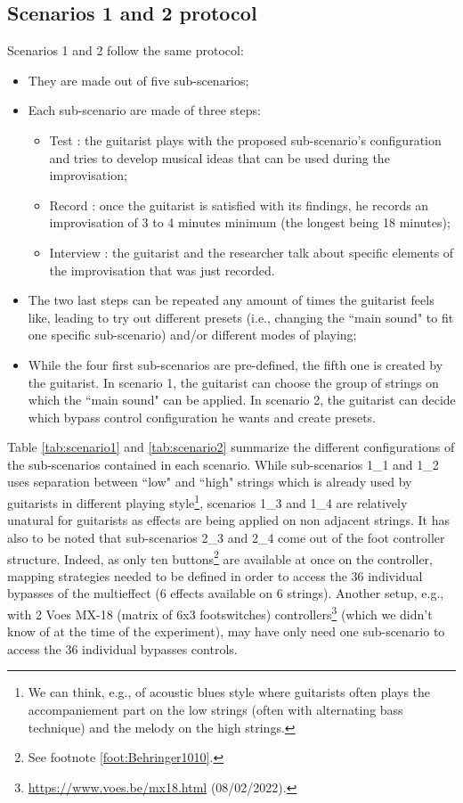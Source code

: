 \documentclass{article}
\begin{document}
\subsection{Scenarios 1 and 2 protocol}
Scenarios 1 and 2 follow the same protocol: 
\begin{itemize}
    \item They are made out of five sub-scenarios;
    \item Each sub-scenario are made of three steps: 
    \begin{itemize}
        \item Test : the guitarist plays with the proposed sub-scenario's configuration and tries to develop musical ideas that can be used during the improvisation;
        \item Record : once the guitarist is satisfied with its findings, he records an improvisation of 3 to 4 minutes minimum (the longest being 18 minutes);
        \item Interview : the guitarist and the researcher talk about specific elements of the improvisation that was just recorded.
    \end{itemize}
    \item The two last steps can be repeated any amount of times the guitarist feels like, leading to try out different presets (i.e., changing the ``main sound" to fit one specific sub-scenario) and/or different modes of playing;
    \item While the four first sub-scenarios are pre-defined, the fifth one is created by the guitarist. In scenario 1, the guitarist can choose the group of strings on which the ``main sound" can be applied. In scenario 2, the guitarist can decide which bypass control configuration he wants and create presets.
\end{itemize}

Table \ref{tab:scenario1} and \ref{tab:scenario2} summarize the different configurations of the sub-scenarios contained in each scenario.
While sub-scenarios 1\_1 and 1\_2 uses separation between ``low" and ``high" strings which is already used by guitarists in different playing style\footnote{We can think, e.g., of acoustic blues style where guitarists often plays the accompaniement part on the low strings (often with alternating bass technique) and the melody on the high strings.}, scenarios 1\_3 and 1\_4 are relatively unatural for guitarists as effects are being applied on non adjacent strings.
It has also to be noted that sub-scenarios 2\_3 and 2\_4 come out of the foot controller structure. Indeed, as only ten buttons\footnote{See footnote \ref{foot:Behringer1010}.} are available at once on the controller, mapping strategies needed to be defined in order to access the 36 individual bypasses of the multieffect (6 effects available on 6 strings). Another setup, e.g., with 2 Voes MX-18 (matrix of 6x3 footswitches) controllers\footnote{\url{https://www.voes.be/mx18.html} (08/02/2022).} (which we didn't know of at the time of the experiment), may have only need one sub-scenario to access the 36 individual bypasses controls.
\end{document}

